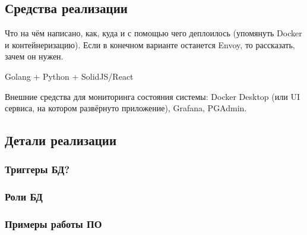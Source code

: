 \subsection{Средства реализации}

Что на чём написано, как, куда и с помощью чего деплоилось (упомянуть Docker и контейнеризацию). Если в конечном варианте останется Envoy, то рассказать, зачем он нужен.

Golang + Python + SolidJS/React

Внешние средства для мониторинга состояния системы: Docker Desktop (или UI сервиса, на котором развёрнуто приложение), Grafana, PGAdmin.



\subsection{Детали реализации}

\subsubsection{Триггеры БД?}

\subsubsection{Роли БД}

\subsubsection{Примеры работы ПО}



\pagebreak